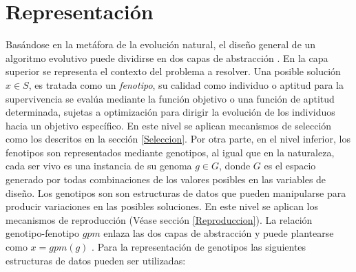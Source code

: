 \section{Representación}
Basándose en la metáfora de la evolución natural, el diseño general de un algoritmo evolutivo puede dividirse en dos capas de abstracción \cite{eiben2015evolutionary}. En la capa superior se representa el contexto del problema a resolver. Una posible solución $x \in S$, es tratada como un \textit{fenotipo}, su calidad como individuo o aptitud para la supervivencia se evalúa mediante la función objetivo o una función de aptitud determinada, sujetas a optimización para dirigir la evolución de los individuos hacia un objetivo específico. En este nivel se aplican mecanismos de selección como los descritos en la sección \ref{Seleccion}. Por otra parte, en el nivel inferior, los fenotipos son representados mediante genotipos, al igual que en la naturaleza, cada ser vivo es una instancia de su genoma $g \in G $, donde $G$ es el espacio generado por todas combinaciones de los valores posibles en las variables de diseño. Los genotipos son son estructuras de datos que pueden manipularse para producir variaciones en las posibles soluciones. En este nivel se aplican los mecanismos de reproducción (Véase sección \ref{Reproduccion}). La relación genotipo-fenotipo $gpm$ enlaza  las dos capas de abstracción y puede plantearse como $x = gpm (g)$ \cite{weise2009global}. Para la representación de genotipos las siguientes estructuras de datos pueden ser utilizadas:

